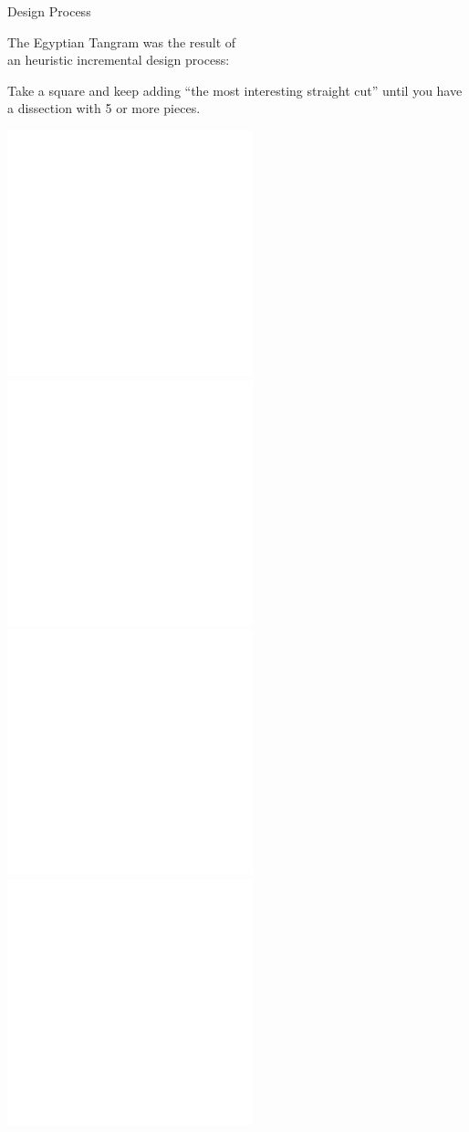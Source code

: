 \documentclass[14pt]{beamer}
\begin{document}

    \begin{frame}{Design Process}
        \begin{center}
            The Egyptian Tangram was the result of\\an heuristic incremental design process:

            \bigskip

            {\small Take a square and keep adding ``the most interesting straight cut'' until you have a dissection with 5 or more pieces.}

            \bigskip \bigskip


            \includegraphics[height=10ex]{figures/figure001e.pdf} \quad \includegraphics[height=10ex]{figures/figure001d.pdf} \quad \includegraphics[height=10ex]{figures/figure001c.pdf} \quad \includegraphics[height=10ex]{figures/figure001b.pdf} \\
        \end{center}
    \end{frame}

\end{document}
